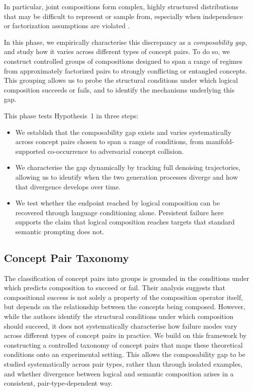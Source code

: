 In particular, joint compositions form complex, highly structured distributions that may be difficult to represent or sample from, especially when independence or factorization assumptions are violated \citep{du2023reduce,du2024compositional}.

In this phase, we empirically characterise this discrepancy as a \textit{composability gap}, and study how it varies across different types of concept pairs. To do so, we construct controlled groups of compositions designed to span a range of regimes from approximately factorized pairs to strongly conflicting or entangled concepts. This grouping allows us to probe the structural conditions under which logical composition succeeds or fails, and to identify the mechanisms underlying this gap.

This phase tests Hypothesis~1 in three steps:
\begin{itemize}
    \item We establish that the composability gap exists and varies systematically across concept pairs chosen to span a range of conditions, from manifold-supported co-occurrence to adversarial concept collision.
    \item We characterise the gap dynamically by tracking full denoising trajectories, allowing us to identify when the two generation processes diverge and how that divergence develops over time.
    \item We test whether the endpoint reached by logical composition can be recovered through language conditioning alone. Persistent failure here supports the claim that logical composition reaches targets that standard semantic prompting does not.
\end{itemize}

\subsection{Concept Pair Taxonomy}
\label{subsec:taxonomy}

The classification of concept pairs into groups is grounded in the conditions under which \citet{mechanisms2025projective} predicts composition to succeed or fail. 
Their analysis suggests that compositional success is not solely a property of the composition operator itself, but depends on the relationship between the concepts being composed. 
However, while the authors identify the structural conditions under which composition should succeed, it does not systematically characterise how failure modes vary across different types of concept pairs in practice. 
We build on this framework by constructing a controlled taxonomy of concept pairs that maps these theoretical conditions onto an experimental setting.
This allows the composability gap to be studied systematically across pair types, rather than through isolated examples, and whether divergence between logical and semantic composition arises in a consistent, pair-type-dependent way.

